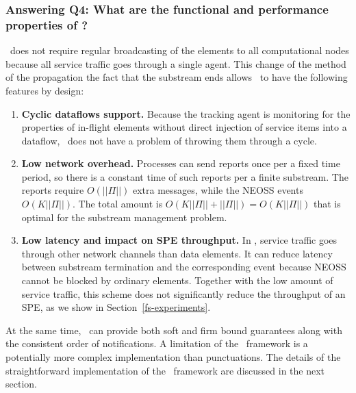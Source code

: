 \subsubsection{Answering Q4: What are the functional and performance properties of \tracker?}

\tracker\ does not require regular broadcasting of the elements to all computational nodes because all service traffic goes through a single agent. This change of the method of the propagation the fact that the substream ends allows \tracker\ to have the following features by design:

\begin{enumerate}
    \item {\bf Cyclic dataflows support.} Because the tracking agent is monitoring for the properties of in-flight elements without direct injection of service items into a dataflow, \tracker\ does not have a problem of throwing them through a cycle.
    \item {\bf Low network overhead.} Processes can send reports once per a fixed time period, so there is a constant time of such reports per a finite substream. The reports require $O(||\Pi||)$ extra messages, while the NEOSS events $O(K||\Pi||)$. The total amount is $O(K||\Pi|| + ||\Pi||) = O(K||\Pi||)$ that is optimal for the substream management problem. 
    \item {\bf Low latency and impact on SPE throughput.} In \tracker, service traffic goes through other network channels than data elements. It can reduce latency between substream termination and the corresponding event because NEOSS cannot be blocked by ordinary elements. Together with the low amount of service traffic, this scheme does not significantly reduce the throughput of an SPE, as we show in Section~\ref{fs-experiments}.
\end{enumerate}

At the same time, \tracker\ can provide both soft and firm bound guarantees along with the consistent order of notifications. A limitation of the \tracker\ framework is a potentially more complex implementation than punctuations. The details of the straightforward implementation of the \tracker\ framework are discussed in the next section.